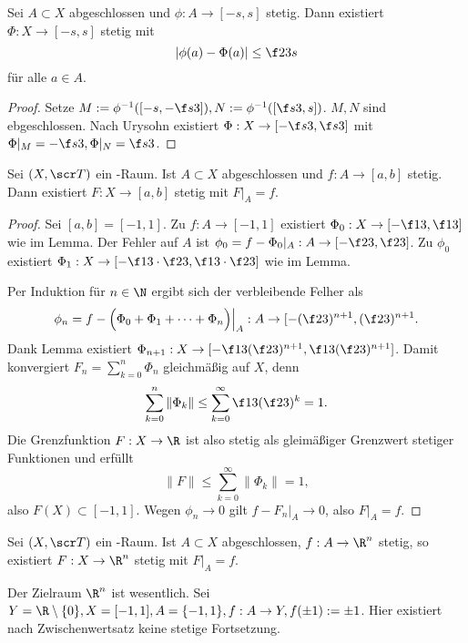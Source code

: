 \begin{lem}
	Sei $A \subset X$ abgeschlossen und $\phi: A \to [-s, s]$ stetig.
	Dann existiert $\Phi: X \to [-s, s]$ stetig mit
	\[
		|\phi(a) - \Phi(a)| \le \f 23 s
	\]
	für alle $a \in A$.
	\begin{proof}
		Setze $M := \phi^{-1}([-s, - \f s3]), N := \phi^{-1}([\f s3, s])$.
		$M, N$ sind ebgeschlossen.
		Nach Urysohn existiert $\Phi: X \to [-\f s3, \f s3]$ mit $\Phi|_M = - \f s3, \Phi|_N = \f s3$.
	\end{proof}
\end{lem}

\begin{st}[Tietze]
	Sei $(X, \scr T)$ ein -Raum.
	Ist $A \subset X$ abgeschlossen und $f: A \to [a,b]$ stetig.
	Dann existiert $F: X \to [a,b]$ stetig mit $F|_A = f$.
	\begin{proof}
		Sei \oBdA $[a,b] = [-1,1]$.
		Zu $f: A \to [-1,1]$ existiert $\Phi_0 : X \to [-\f 13, \f 13]$ wie im Lemma.
		Der Fehler auf $A$ ist $\phi_0 = f - \Phi_0|_A : A \to [-\f 23, \f 23]$.
		Zu $\phi_0$ existiert $\Phi_1: X \to [-\f 13 \cdot \f 23, \f 13 \cdot \f 23]$ wie im Lemma. %

		Per Induktion für $n \in \N$ ergibt sich der verbleibende Felher als
		\[
			\phi_n = f - \Big( \Phi_0 + \Phi_1 + \dotsb + \Phi_n \Big)\Big|_A
			: A \to [-(\f 23)^{n+1}, (\f 23)^{n+1}.
		\]
		Dank Lemma existiert $\Phi_{n+1}: X \to [-\f 13(\f 23)^{n+1}, \f 13 (\f 23)^{n+1}]$.
		Damit konvergiert $F_n = \sum_{k=0}^n \Phi_n$ gleichmäßig auf $X$, denn
		\[
			\sum_{k=0}^n \|\Phi_k\|
			\le \sum_{k=0}^\infty \f 13 (\f 23)^k
			= 1.
		\]
		Die Grenzfunktion $F: X \to \R$ ist also stetig als gleimäßiger Grenzwert stetiger Funktionen und erfüllt
		\[
			\|F\| \le \sum_{k=0}^\infty \|\Phi_k\| = 1,
		\]
		also $F(X) \subset [-1, 1]$.
		Wegen $\phi_n \to 0$ gilt $f - F_n|_A \to 0$, also $F|_A = f$.
	\end{proof}
\end{st}

\begin{kor}
	Sei $(X, \scr T)$ ein -Raum.
	Ist $A \subset X$ abgeschlossen, $f: A \to \R^n$ stetig, so existiert $F: X \to \R^n$ stetig mit $F|_A = f$.
	\begin{note}
		Der Zielraum $\R^n$ ist wesentlich.
		Sei $Y = \R \setminus \{0\}, X = [-1,1], A = \{-1, 1\}, f: A \to Y, f(\pm 1) := \pm 1$.
		Hier existiert nach Zwischenwertsatz keine stetige Fortsetzung.
	\end{note}
\end{kor}


